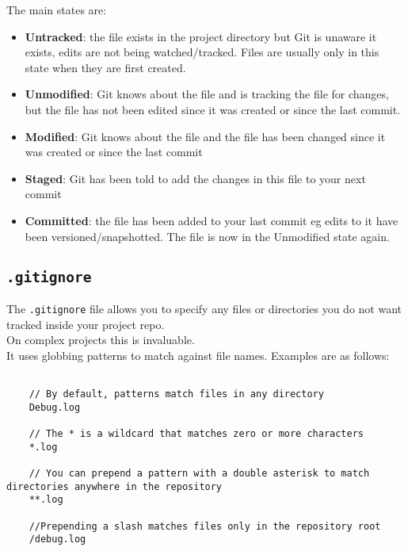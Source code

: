 The main states are:

\begin{itemize}
	\item \textbf{Untracked}: the file exists in the project directory but Git is unaware it exists, edits are not being watched/tracked. Files are usually only in this state when they are first created.
    \item \textbf{Unmodified}: Git knows about the file and is tracking the file for changes, but the file has not been edited since it was created or since the last commit.
    \item \textbf{Modified}: Git knows about the file and the file has been changed since it was created or since the last commit
    \item \textbf{Staged}: Git has been told to add the changes in this file to your next commit
    \item \textbf{Committed}: the file has been added to your last commit eg edits to it have been versioned/snapshotted. The file is now in the Unmodified state again.
\end{itemize}


\subsection{\texttt{.gitignore}}

The \texttt{.gitignore} file allows you to specify any files or directories you do not want tracked inside your project repo.
\\

On complex projects this is invaluable.
\\

It uses globbing patterns to match against file names. Examples are as follows:


\begin{verbatim}
    
    // By default, patterns match files in any directory
    Debug.log

    // The * is a wildcard that matches zero or more characters
    *.log

    // You can prepend a pattern with a double asterisk to match directories anywhere in the repository
    **.log

    //Prepending a slash matches files only in the repository root
    /debug.log

\end{verbatim}

